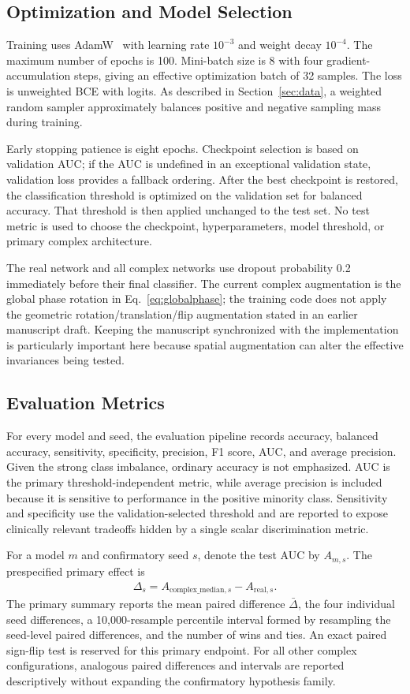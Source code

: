 \documentclass[journal]{IEEEtran}
\begin{document}
\subsection{Optimization and Model Selection}
Training uses AdamW~\cite{Loshchilov2019AdamW} with learning rate $10^{-3}$ and weight decay $10^{-4}$. The maximum number of epochs is 100. Mini-batch size is 8 with four gradient-accumulation steps, giving an effective optimization batch of 32 samples. The loss is unweighted \ac{BCE} with logits. As described in Section~\ref{sec:data}, a weighted random sampler approximately balances positive and negative sampling mass during training.

Early stopping patience is eight epochs. Checkpoint selection is based on validation AUC; if the AUC is undefined in an exceptional validation state, validation loss provides a fallback ordering. After the best checkpoint is restored, the classification threshold is optimized on the validation set for balanced accuracy. That threshold is then applied unchanged to the test set. No test metric is used to choose the checkpoint, hyperparameters, model threshold, or primary complex architecture.

The real network and all complex networks use dropout probability 0.2 immediately before their final classifier. The current complex augmentation is the global phase rotation in Eq.~\eqref{eq:globalphase}; the training code does not apply the geometric rotation/translation/flip augmentation stated in an earlier manuscript draft. Keeping the manuscript synchronized with the implementation is particularly important here because spatial augmentation can alter the effective invariances being tested.

\subsection{Evaluation Metrics}
For every model and seed, the evaluation pipeline records accuracy, balanced accuracy, sensitivity, specificity, precision, F1 score, AUC, and average precision. Given the strong class imbalance, ordinary accuracy is not emphasized. AUC is the primary threshold-independent metric, while average precision is included because it is sensitive to performance in the positive minority class. Sensitivity and specificity use the validation-selected threshold and are reported to expose clinically relevant tradeoffs hidden by a single scalar discrimination metric.

For a model $m$ and confirmatory seed $s$, denote the test AUC by $A_{m,s}$. The prespecified primary effect is
\begin{align}
\Delta_s
= A_{\mathrm{complex\_median},s}
- A_{\mathrm{real},s}.
\label{eq:delta}
\end{align}
The primary summary reports the mean paired difference $\bar\Delta$, the four individual seed differences, a 10,000-resample percentile interval formed by resampling the seed-level paired differences, and the number of wins and ties. An exact paired sign-flip test is reserved for this primary endpoint. For all other complex configurations, analogous paired differences and intervals are reported descriptively without expanding the confirmatory hypothesis family.
\end{document}
